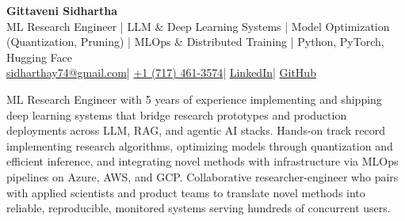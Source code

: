 \documentclass[letterpaper,9.5pt]{article}
\newcommand{\resumeSection}[1]{%
  \vspace{3pt}\noindent{\large\bfseries\color{linkblue}#1}\par
  \vspace{-3pt}\noindent{\color{linkblue}\rule{\textwidth}{0.45pt}}\vspace{1pt}%
}
\begin{document}
\begin{center}
  {\Huge\bfseries Gittaveni Sidhartha}\\[2pt]
  {\large ML Research Engineer | LLM \& Deep Learning Systems | Model Optimization (Quantization, Pruning) | MLOps \& Distributed Training | Python, PyTorch, Hugging Face}\\[4pt]
  {\small
    \href{mailto:sidharthay74@gmail.com}{sidharthay74@gmail.com}\enspace|\enspace
    \href{tel:+17174613574}{+1 (717) 461-3574}\enspace|\enspace
    \href{https://www.linkedin.com/in/sidharthay74/}{LinkedIn}\enspace|\enspace
    \href{https://github.com/zentrium74}{GitHub}
  }
\end{center}
\vspace{-3pt}

\resumeSection{Summary}
ML Research Engineer with 5 years of experience implementing and shipping deep learning systems that bridge research prototypes and production deployments across LLM, RAG, and agentic AI stacks. Hands-on track record implementing research algorithms, optimizing models through quantization and efficient inference, and integrating novel methods with infrastructure via MLOps pipelines on Azure, AWS, and GCP. Collaborative researcher-engineer who pairs with applied scientists and product teams to translate novel methods into reliable, reproducible, monitored systems serving hundreds of concurrent users.
\end{document}
